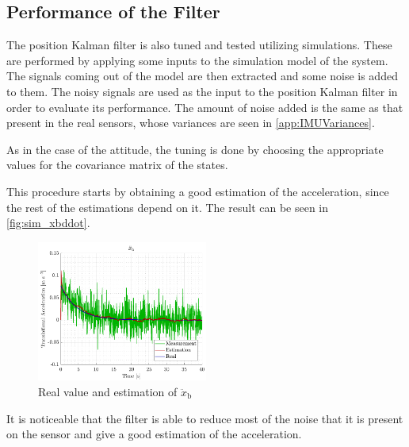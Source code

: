 \subsection{Performance of the Filter}
The position Kalman filter is also tuned and tested utilizing simulations. These are performed by applying some inputs to the simulation model of the system. The signals coming out of the model are then extracted and some noise is added to them. The noisy signals are used as the input to the position Kalman filter in order to evaluate its performance. The amount of noise added is the same as that present in the real sensors, whose variances are seen in \autoref{app:IMUVariances}.

As in the case of the attitude, the tuning is done by choosing the appropriate values for the covariance matrix of the states. 

This procedure starts by obtaining a good estimation of the acceleration, since the rest of the estimations depend on it. The result can be seen in \autoref{fig:sim_xbddot}.

\begin{figure}[H]
    \includegraphics[width=0.5\textwidth]{figures/sim_xbddot}
    \caption{ Real value and estimation of $\ddot{x}_\mathrm{b}$}
    \label{fig:sim_xbddot}
\end{figure}
        
It is noticeable that the filter is able to reduce most of the noise that it is present on the sensor and give a good estimation of the acceleration.
 
